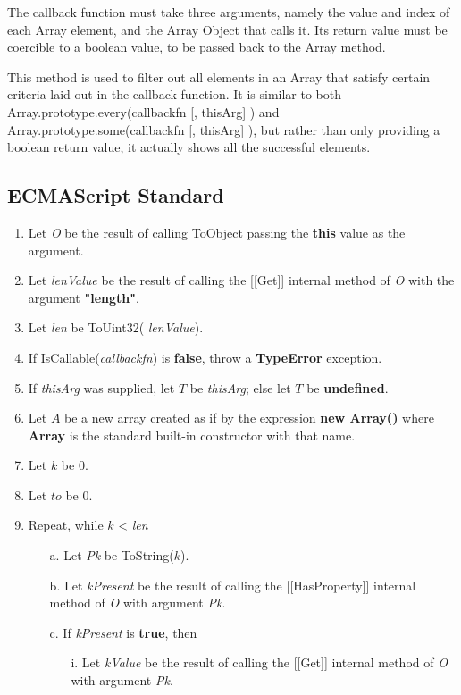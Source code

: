 \documentclass[a4paper,11pt,twoside]{report}
\begin{document}
The callback function must take three arguments, namely the value and index of each Array element, and the Array Object that calls it. Its return value must be coercible to a boolean value, to be passed back to the Array method.

This method is used to filter out all elements in an Array that satisfy certain criteria laid out in the callback function. It is similar to both Array.prototype.every(callbackfn [, thisArg] ) and Array.prototype.some(callbackfn [, thisArg] ), but rather than only providing a boolean return value, it actually shows all the successful elements.

\subsection{ECMAScript Standard}
\begin{enumerate}
\item Let \textit{O} be the result of calling ToObject passing the \textbf{this} value as the argument.
\item Let \textit{lenValue} be the result of calling the [[Get]] internal method of \textit{O} with the argument \textbf{"length"}.
\item Let \textit{len} be ToUint32( \textit{lenValue}).
\item If IsCallable(\textit{callbackfn}) is \textbf{false}, throw a \textbf{TypeError} exception.
\item If \textit{thisArg} was supplied, let $T$ be \textit{thisArg}; else let $T$ be \textbf{undefined}.
\item Let $A$ be a new array created as if by the expression \textbf{new Array()} where \textbf{Array} is the standard built-in constructor with that name.
\item Let $k$ be 0.
\item Let $to$ be 0.
\item Repeat, while $k$ < \textit{len}
\begin{enumerate}
\item[a.] Let \textit{Pk} be ToString($k$).
\item[b.] Let \textit{kPresent} be the result of calling the [[HasProperty]] internal method of \textit{O} with argument \textit{Pk}.
\item[c.] If \textit{kPresent} is \textbf{true}, then
\begin{enumerate}
\item[i.] Let \textit{kValue} be the result of calling the [[Get]] internal method of \textit{O} with argument \textit{Pk}.

\end{enumerate}
\end{enumerate}
\end{enumerate}
\end{document}
